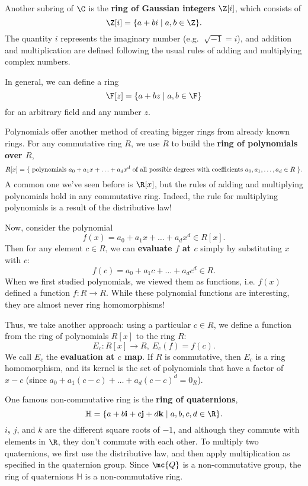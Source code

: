 \documentclass[math1530-lecture-notes]{subfiles}
\begin{document}
\begin{example}
  Another subring of $\C$ is the \textbf{ring of Gaussian integers} $\Z[i]$, which consists of \[
    \Z[i] = \{a+bi\mid a,b\in \Z\} 
  .\] The quantity $i$ represents the imaginary number (e.g. $\sqrt[]{-1} =i$), and addition and
  multiplication are defined following the usual rules of adding and multiplying complex numbers.

  In general, we can define a ring \[
    \F[z] = \{a+bz\mid a,b\in \F\} 
  \] for an arbitrary field and any number $z$.
\end{example}

\begin{example}
  Polynomials offer another method of creating bigger rings from already known rings. For any
  commutative ring $R$, we use $R$ to build the \textbf{ring of polynomials over $R$}, \[
    R[x] = \{ ~\text{polynomials $a_0+a_1x+\ldots+a_dx^{d}$ of all possible degrees with
    coefficients $ a_0,a_1,\ldots,a_d\in R$}~ \}
  .\] A common one we've seen before is $\R[x]$, but the rules of adding and multiplying polynomials
  hold in any commutative ring. Indeed, the rule for multiplying polynomials is a result of the
  distributive law!

  Now, consider the polynomial \[
    f(x) = a_0+a_1x+\ldots+a_dx^{d}\in R[x]
  .\] Then for any element $c\in R$, we can \textbf{evaluate $f$ at $c$} simply by substituting $x$ 
  with $c$: \[
    f(c) = a_0+a_1c+\ldots+a_dc^{d}\in R
  .\] When we first studied polynomials, we viewed them as functions, i.e. $f(x)$ defined a function
  $f:R\to R$. While these polynomial functions are interesting, they are almost never ring
  homomorphisms!

  Thus, we take another approach: using a particular $c\in R$, we define a function from the ring of
  polynomials $R[x]$ to the ring $R$: \[
    E_c: R[x]\longrightarrow R,\ E_c(f) = f(c)
  .\] We call $E_c$ the \textbf{evaluation at $c$ map}. If $R$ is commutative, then $E_c$ is a ring
  homomorphism, and its kernel is the set of polynomials that have a factor of $x-c$ (since $
  a_0+a_1(c-c)+\ldots+a_d(c-c)^{d}=0_R$).
\end{example}

\begin{example}
  One famous non-commutative ring is the \textbf{ring of quaternions}, \[
    \mathbb{H} = \{a+b\textbf{i}+c \textbf{j}+d\textbf{k} \mid a,b,c,d\in \R \} 
  .\] \textbf{$i$, $j$}, and \textbf{$k$} are the different square roots of $-1$, and although they
  commute with elements in $\R$, they don't commute with each other. To multiply two quaternions, we
  first use the distributive law, and then apply multiplication as specified in the quaternion
  group. Since $\mc{Q}$ is a non-commutative group, the ring of quaternions $\mathbb{H}$ is a
  non-commutative ring.
\end{example}
\end{document}
